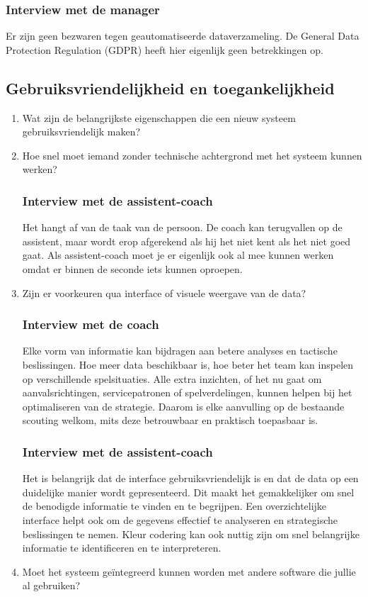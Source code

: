 \begin{enumerate}
  \subsubsection{Interview met de manager}
  Er zijn geen bezwaren tegen geautomatiseerde dataverzameling. De General Data Protection Regulation (GDPR) heeft hier eigenlijk geen betrekkingen op.
\end{enumerate}

\subsection{Gebruiksvriendelijkheid en toegankelijkheid}
\begin{enumerate}
  \item Wat zijn de belangrijkste eigenschappen die een nieuw systeem gebruiksvriendelijk maken?
  \item Hoe snel moet iemand zonder technische achtergrond met het systeem kunnen werken?
  \subsubsection{Interview met de assistent-coach}
  Het hangt af van de taak van de persoon. De coach kan terugvallen op de assistent, maar wordt erop afgerekend als hij het niet kent als het niet goed gaat. Als assistent-coach moet je er eigenlijk ook al mee kunnen werken omdat er binnen de seconde iets kunnen oproepen.
  \item Zijn er voorkeuren qua interface of visuele weergave van de data?
  \subsubsection{Interview met de coach}
  Elke vorm van informatie kan bijdragen aan betere analyses en tactische beslissingen. Hoe meer data beschikbaar is, hoe beter het team kan inspelen op verschillende spelsituaties. Alle extra inzichten, of het nu gaat om aanvalsrichtingen, servicepatronen of spelverdelingen, kunnen helpen bij het optimaliseren van de strategie. Daarom is elke aanvulling op de bestaande scouting welkom, mits deze betrouwbaar en praktisch toepasbaar is.
  \subsubsection{Interview met de assistent-coach}
  Het is belangrijk dat de interface gebruiksvriendelijk is en dat de data op een duidelijke manier wordt gepresenteerd. Dit maakt het gemakkelijker om snel de benodigde informatie te vinden en te begrijpen. Een overzichtelijke interface helpt ook om de gegevens effectief te analyseren en strategische beslissingen te nemen. Kleur codering kan ook nuttig zijn om snel belangrijke informatie te identificeren en te interpreteren.
  \item Moet het systeem geïntegreerd kunnen worden met andere software die jullie al gebruiken?

\end{enumerate}
